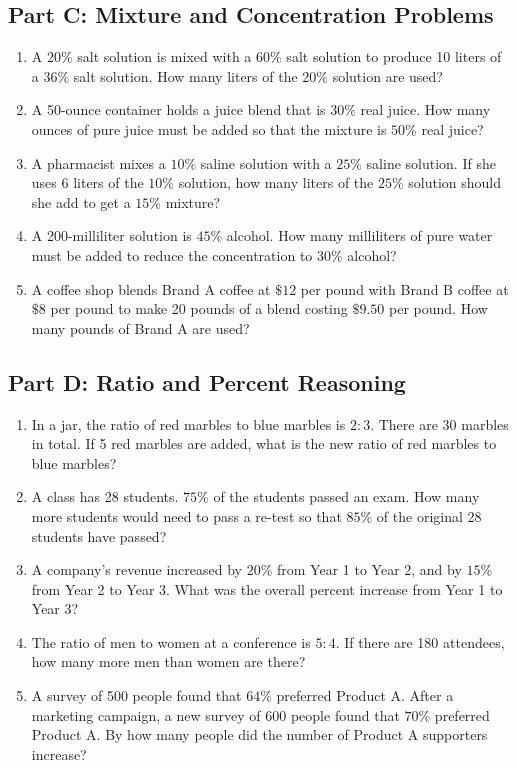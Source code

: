 \documentclass[14pt]{extarticle}
\begin{document}
\subsection*{Part C: Mixture and Concentration Problems}
\begin{enumerate}
  \item A \(20\%\) salt solution is mixed with a \(60\%\) salt solution to produce 10 liters of a \(36\%\) salt solution. How many liters of the \(20\%\) solution are used?
  \item A 50-ounce container holds a juice blend that is \(30\%\) real juice. How many ounces of pure juice must be added so that the mixture is \(50\%\) real juice?
  \item A pharmacist mixes a \(10\%\) saline solution with a \(25\%\) saline solution. If she uses 6 liters of the \(10\%\) solution, how many liters of the \(25\%\) solution should she add to get a \(15\%\) mixture?
  \item A 200-milliliter solution is \(45\%\) alcohol. How many milliliters of pure water must be added to reduce the concentration to \(30\%\) alcohol?
  \item A coffee shop blends Brand A coffee at \(\$12\) per pound with Brand B coffee at \(\$8\) per pound to make 20 pounds of a blend costing \(\$9.50\) per pound. How many pounds of Brand A are used?
\end{enumerate}

\subsection*{Part D: Ratio and Percent Reasoning}
\begin{enumerate}
  \item In a jar, the ratio of red marbles to blue marbles is \(2:3\). There are 30 marbles in total. If 5 red marbles are added, what is the new ratio of red marbles to blue marbles?
  \item A class has 28 students. \(75\%\) of the students passed an exam. How many more students would need to pass a re-test so that \(85\%\) of the original 28 students have passed?
  \item A company's revenue increased by \(20\%\) from Year 1 to Year 2, and by \(15\%\) from Year 2 to Year 3. What was the overall percent increase from Year 1 to Year 3?
  \item The ratio of men to women at a conference is \(5:4\). If there are 180 attendees, how many more men than women are there?
  \item A survey of 500 people found that \(64\%\) preferred Product A. After a marketing campaign, a new survey of 600 people found that \(70\%\) preferred Product A. By how many people did the number of Product A supporters increase?
\end{enumerate}
\end{document}
